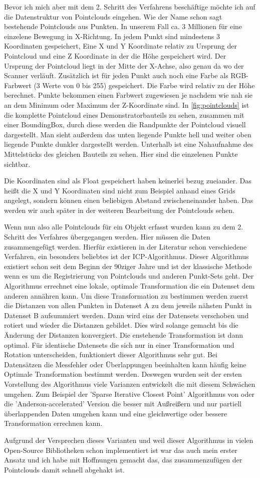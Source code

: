 \documentclass[../main.tex]{subfiles}
\begin{document}
Bevor ich mich aber mit dem 2. Schritt des Verfahrens beschäftige möchte ich auf die 
Datenstruktur von Pointclouds eingehen. Wie der Name schon sagt bestehende
Pointclouds aus Punkten. In unserem Fall ca. 3 Millionen für eine einzelene
Bewegung in X-Richtung. In jedem Punkt sind mindestens 3 Koordinaten gespeichert, 
Eine X und Y Koordinate relativ zu Ursprung der Pointcloud und eine Z Koordinate 
in der die Höhe gespeichert wird. Der Ursprung der Pointcloud liegt in der Mitte 
der X-Achse, also genau da wo der Scanner verläuft.
Zusätzlich ist für jeden Punkt auch noch eine Farbe als RGB-Farbwert
(3 Werte von 0 bis 255) gespeichert. Die Farbe wird relativ zu der Höhe
berechnet. Punkte bekommen einen Farbwert zugewiesen je nachdem wie nah 
sie an dem Minimum oder Maximum der Z-Koordinate sind. 
In \ref{fig:pointclouds} ist die komplette Pointcloud eines Demonstratorbauteils 
zu sehen, zusammen mit einer BoundingBox, durch diese werden die Randpunkte
der Pointcloud visuell dargestellt. Man sieht außerdem das unten liegende Punkte
hell und weiter oben liegende Punkte dunkler dargestellt werden.
Unterhalb ist eine Nahaufnahme des Mittelstücks des gleichen Bauteils zu sehen. 
Hier sind die einzelenen Punkte sichtbar.

Die Koordinaten sind als Float gespeichert haben keinerlei bezug zueiander.
Das heißt die X und Y Koordinaten sind nicht zum Beispiel anhand eines Grids 
angelegt, sondern können einen beliebigen Abstand zwischeneinander haben. Das
werden wir auch später in der weiteren Bearbeitung der Pointclouds sehen.

Wenn nun also alle Pointclouds für ein Objekt erfasst wurden kann zu dem 2.
Schritt des Verfahres übergegangen werden. Hier müssen die Daten zusammengefügt 
werden. 
Hierfür existieren in der Literatur schon verschiedene Verfahren, ein 
besonders beliebtes ist der ICP-Algorithmus.
Dieser Algorithmus existiert schon seit dem Beginn der 90ziger Jahre und ist 
der klassische Methode wenn es um die Registrierung von Pointclouds und 
anderen Punkt-Sets geht. \cite[]{icp}
Der Algorithmus errechnet eine lokale, optimale Transformation die ein Datenset
dem anderen annähren kann. \cite{icp_og}
Um diese Transformation zu bestimmen werden zuerst die Distanzen von allen 
Punkten in Datenset A zu dem jeweils nähsten Punkt in Datenset B aufsummiert 
werden. Dann wird eins der Datensets verschoben und rotiert und wieder die 
Distanzen gebildet. Dies wird solange gemacht bis die Änderung der Distanzen 
konvergiert. Die enstehende Transformation ist dann optimal.
Für identische Datensets die sich nur in einer Transformation und Rotation 
unterscheiden, funktioniert dieser Algorithmus sehr gut. Bei Datensätzen die 
Messfehler oder Überlappungen beeinhalten kann häufig keine Optimale 
Transformation bestimmt werden.
Deswegen wurden seit der ersten Vorstellung des Algorithmus viele Varianzen
entwickelt die mit diesem Schwächen umgehen. 
Zum Beispiel der 'Sparse Iterative Closest Point' Algorithmus von \cite{Bouaziz.2013}
oder die 'Anderson-accelerated' Version die besser mit Außreißern und nur 
partiell überlappenden Daten umgehen kann und eine gleichwertige oder bessere 
Transformation errechnen kann. \cite{icp}

Aufgrund der Versprechen dieses Varianten und weil dieser Algorithmus in vielen
Open-Source Bibliotheken schon implementiert ist war das auch mein erster Ansatz
und ich habe mit Hoffnungen gemacht das, das zusammenzufügen der Pointclouds 
damit schnell abgehakt ist.
\end{document}
